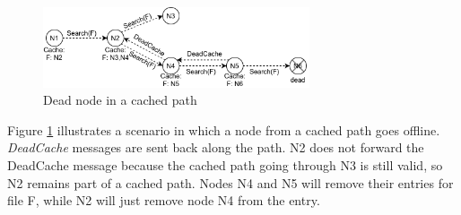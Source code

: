 \begin{figure}
    \centering
    \includegraphics[width=0.7\textwidth]{figures/fig6}
    \caption{Dead node in a cached path}
    \label{fig:fig6}
\end{figure}

Figure \ref{fig:fig6} illustrates a scenario in which a node from a cached path 
goes offline. \textit{DeadCache} messages are sent back along the path. N2 does 
not forward the DeadCache message because the cached path going through N3 is 
still valid, so N2 remains part of a cached path. Nodes N4 and N5 will remove 
their entries for file F, while N2 will just remove node N4 from the entry.
